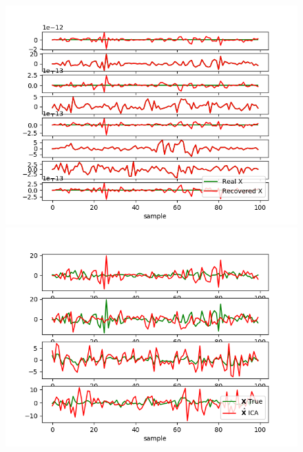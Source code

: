 \begin{figure}[H]
    \begin{minipage}[t]{.45\textwidth}
		\centering
		\includegraphics[scale=0.5]{figures/ch_7/M=N_testk=4.png}
	\caption{}
	\label{fig:M=N_k=4}
    \end{minipage} 
    \hfill
    \begin{minipage}[t]{.45\textwidth}
		\centering
		\includegraphics[scale=0.5]{figures/ICAapp/ICA_app4.png}
	\caption{}
	\label{fig:}
    \end{minipage}
\end{figure}
